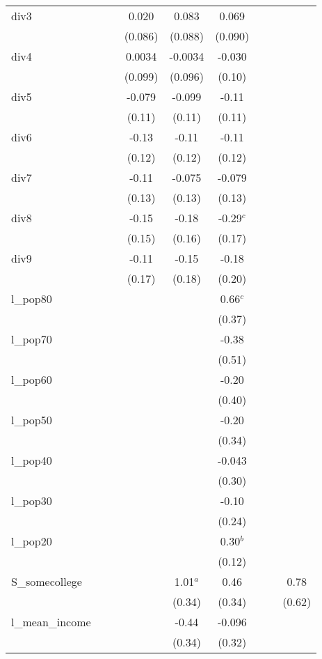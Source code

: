 \documentclass[]{article}
\begin{document}
\begin{tabular}{lcccccccc}
div3 &  &  & 0.020 & 0.083 & 0.069 &  &  &  \\
 &  &  & (0.086) & (0.088) & (0.090) &  &  &  \\
div4 &  &  & 0.0034 & -0.0034 & -0.030 &  &  &  \\
 &  &  & (0.099) & (0.096) & (0.10) &  &  &  \\
div5 &  &  & -0.079 & -0.099 & -0.11 &  &  &  \\
 &  &  & (0.11) & (0.11) & (0.11) &  &  &  \\
div6 &  &  & -0.13 & -0.11 & -0.11 &  &  &  \\
 &  &  & (0.12) & (0.12) & (0.12) &  &  &  \\
div7 &  &  & -0.11 & -0.075 & -0.079 &  &  &  \\
 &  &  & (0.13) & (0.13) & (0.13) &  &  &  \\
div8 &  &  & -0.15 & -0.18 & -0.29$^c$ &  &  &  \\
 &  &  & (0.15) & (0.16) & (0.17) &  &  &  \\
div9 &  &  & -0.11 & -0.15 & -0.18 &  &  &  \\
 &  &  & (0.17) & (0.18) & (0.20) &  &  &  \\
l\_pop80 &  &  &  &  & 0.66$^c$ &  &  &  \\
 &  &  &  &  & (0.37) &  &  &  \\
l\_pop70 &  &  &  &  & -0.38 &  &  &  \\
 &  &  &  &  & (0.51) &  &  &  \\
l\_pop60 &  &  &  &  & -0.20 &  &  &  \\
 &  &  &  &  & (0.40) &  &  &  \\
l\_pop50 &  &  &  &  & -0.20 &  &  &  \\
 &  &  &  &  & (0.34) &  &  &  \\
l\_pop40 &  &  &  &  & -0.043 &  &  &  \\
 &  &  &  &  & (0.30) &  &  &  \\
l\_pop30 &  &  &  &  & -0.10 &  &  &  \\
 &  &  &  &  & (0.24) &  &  &  \\
l\_pop20 &  &  &  &  & 0.30$^b$ &  &  &  \\
 &  &  &  &  & (0.12) &  &  &  \\
S\_somecollege &  &  &  & 1.01$^a$ & 0.46 &  &  & 0.78 \\
 &  &  &  & (0.34) & (0.34) &  &  & (0.62) \\
l\_mean\_income &  &  &  & -0.44 & -0.096 &  &  &  \\
 &  &  &  & (0.34) & (0.32) &  &  &  \\

\end{tabular}
\end{document}
